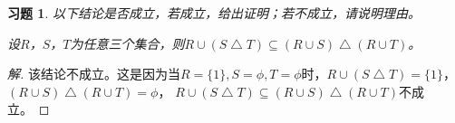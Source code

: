 \documentclass{article}
\begin{document}
\begin{CJK}{UTF8}{gbsn}
  \newtheorem*{Ex}{习题}
  \begin{Ex}
    以下结论是否成立，若成立，给出证明；若不成立，请说明理由。
    
      设$R$，$S$，$T$为任意三个集合，则$R\cup (S\bigtriangleup T) \subseteq(R\cup S)\bigtriangleup (R\cup T) $。
\end{Ex}
\begin{proof}[解]
  该结论不成立。这是因为当$R=\{1\}, S=\phi, T = \phi$时，$R\cup (S\bigtriangleup T)=\{1\}$，$(R\cup S)\bigtriangleup (R\cup T)=\phi$， $R\cup (S\bigtriangleup T) \subseteq(R\cup S)\bigtriangleup (R\cup T)$不成立。
\end{proof}
\end{CJK}
\end{document}
